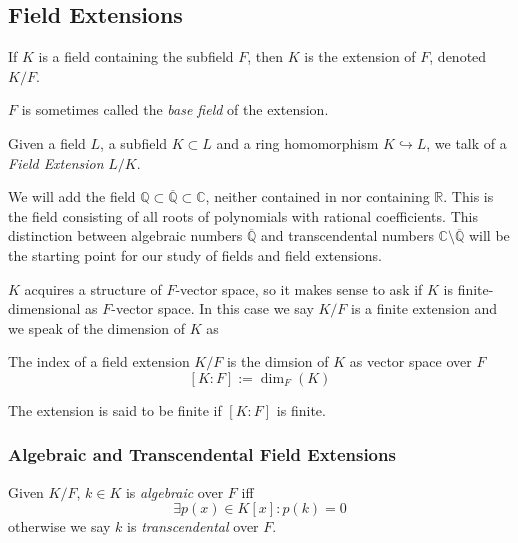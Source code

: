 \subsection{Field Extensions}
\begin{definition}
   If \(K\) is a field containing the subfield \(F\), then \(K\) is the extension of \(F\), denoted \(K/F\).
\end{definition}
\begin{remark}[Terminology]
   \(F\) is sometimes called the \emph{base field} of the extension.
\end{remark}
\begin{remark}
   Given a field \(L\), a subfield \(K \subset L\) and a ring homomorphism \(K \hookrightarrow L\), we talk of a \emph{Field Extension} \(L/K\).
\end{remark}

We will add the field \(\mathbb{Q} \subset \overline{\mathbb{Q}} \subset \mathbb{C}\), neither contained in nor containing \(\mathbb{R}\).
This is the field consisting of all roots of polynomials with rational coefficients.
This distinction between algebraic numbers \(\overline{\mathbb{Q}}\) and transcendental numbers \(\mathbb{C} \setminus \overline{\mathbb{Q}}\) will be the starting point for our study of fields and field extensions.

\(K\) acquires a structure of \(F\)-vector space, so it makes sense to ask if \(K\) is finite-dimensional as \(F\)-vector space.
In this case we say \(K/F\) is a finite extension and we speak of the dimension of \(K\) as
\begin{definition}
   The index of a field extension \(K/F\) is the dimsion of \(K\) as vector space over \(F\)
   \[[K:F] := \dim_F(K)\]
\end{definition}
\begin{remark}[Terminology]
   The extension is said to be finite if \([K:F]\) is finite.
\end{remark}

\subsubsection{Algebraic and Transcendental Field Extensions}
\begin{definition}
   Given \(K/F\), \(k \in K\) is \emph{algebraic} over \(F\) iff
   \[\exists p(x) \in K[x]: p(k) = 0\]
   otherwise we say \(k\) is \emph{transcendental} over \(F\).
\end{definition}

